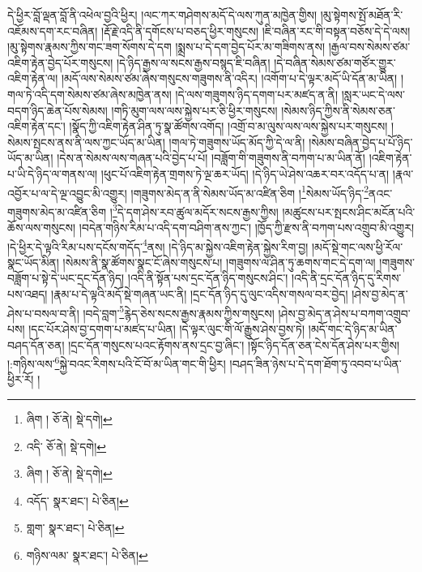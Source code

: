 དེ་ཕྱིར་བློ་ལྡན་བློ་ནི་འཕེལ་བྱའི་ཕྱིར། །ལང་ཀར་གཤེགས་མདོ་དེ་ལས་ཀུན་མཁྱེན་གྱིས། །མུ་སྟེགས་སྤོ་མཐོན་རི་འཇོམས་དག་རང་བཞིན། །རྡོ་རྗེ་འདི་ནི་དགོངས་པ་བཅད་ཕྱིར་གསུངས། །ཇི་བཞིན་རང་གི་བསྟན་བཅོས་དེ་དེ་ལས། །མུ་སྟེགས་རྣམས་ཀྱིས་གང་ཟག་སོགས་དེ་དག །སྨྲས་པ་དེ་དག་བྱེད་པོར་མ་གཟིགས་ནས། །རྒྱལ་བས་སེམས་ཙམ་འཇིག་རྟེན་བྱེད་པོར་གསུངས། །དེ་ཉིད་རྒྱས་ལ་སངས་རྒྱས་བསྙད་ཇི་བཞིན། །དེ་བཞིན་སེམས་ཙམ་གཙོར་གྱུར་འཇིག་རྟེན་ལ། །མདོ་ལས་སེམས་ཙམ་ཞེས་གསུངས་གཟུགས་ནི་འདིར། །འགོག་པ་དེ་ལྟར་མདོ་ཡི་དོན་མ་ཡིན། །གལ་ཏེ་འདི་དག་སེམས་ཙམ་ཞེས་མཁྱེན་ནས། །དེ་ལས་གཟུགས་ཉིད་དགག་པར་མཛད་ན་ནི། །སླར་ཡང་དེ་ལས་བདག་ཉིད་ཆེན་པོས་སེམས། །གཏི་མུག་ལས་ལས་སྐྱེས་པར་ཅི་ཕྱིར་གསུངས། །སེམས་ཉིད་ཀྱིས་ནི་སེམས་ཅན་འཇིག་རྟེན་དང་། །སྣོད་ཀྱི་འཇིག་རྟེན་ཤིན་ཏུ་སྣ་ཚོགས་འགོད། །འགྲོ་བ་མ་ལུས་ལས་ལས་སྐྱེས་པར་གསུངས། །སེམས་སྤངས་ནས་ནི་ལས་ཀྱང་ཡོད་མ་ཡིན། །གལ་ཏེ་གཟུགས་ཡོད་མོད་ཀྱི་དེ་ལ་ནི། །སེམས་བཞིན་བྱེད་པ་པོ་ཉིད་ཡོད་མ་ཡིན། །དེས་ན་སེམས་ལས་གཞན་པའི་བྱེད་པ་པོ། །བཟློག་གི་གཟུགས་ནི་བཀག་པ་མ་ཡིན་ནོ། །འཇིག་རྟེན་པ་ཡི་དེ་ཉིད་ལ་གནས་ལ། །ཕུང་པོ་འཇིག་རྟེན་གྲགས་ཏེ་ལྔ་ཆར་ཡོད། །དེ་ཉིད་ཡེ་ཤེས་འཆར་བར་འདོད་པ་ན། །རྣལ་འབྱོར་པ་ལ་དེ་ལྔ་འབྱུང་མི་འགྱུར། །གཟུགས་མེད་ན་ནི་སེམས་ཡོད་མ་འཛིན་ཅིག །\footnote{ཞིག །  ཅོ་ནེ།  སྡེ་དགེ། }སེམས་ཡོད་ཉིད་\footnote{འདི་  ཅོ་ནེ།  སྡེ་དགེ། }ནའང་གཟུགས་མེད་མ་འཛིན་ཅིག །\footnote{ཞིག །  ཅོ་ནེ།  སྡེ་དགེ། }དེ་དག་ཤེས་རབ་ཚུལ་མདོར་སངས་རྒྱས་ཀྱིས། །མཚུངས་པར་སྤངས་ཤིང་མངོན་པའི་ཆོས་ལས་གསུངས། །བདེན་གཉིས་རིམ་པ་འདི་དག་བཤིག་ནས་ཀྱང་། །ཁྱོད་ཀྱི་རྫས་ནི་བཀག་པས་འགྲུབ་མི་འགྱུར། །དེ་ཕྱིར་དེ་ལྟའི་རིམ་པས་དངོས་གདོད་\footnote{འདོད་  སྣར་ཐང་།  པེ་ཅིན། }ནས། །དེ་ཉིད་མ་སྐྱེས་འཇིག་རྟེན་སྐྱེས་རིག་བྱ། །མདོ་སྡེ་གང་ལས་ཕྱི་རོལ་སྣང་ཡོད་མིན། །སེམས་ནི་སྣ་ཚོགས་སྣང་ངོ་ཞེས་གསུངས་པ། །གཟུགས་ལ་ཤིན་ཏུ་ཆགས་གང་དེ་དག་ལ། །གཟུགས་བཟློག་པ་སྟེ་དེ་ཡང་དྲང་དོན་ཉིད། །འདི་ནི་སྟོན་པས་དྲང་དོན་ཉིད་གསུངས་ཤིང་། །འདི་ནི་དྲང་དོན་ཉིད་དུ་རིགས་པས་འཐད། །རྣམ་པ་དེ་ལྟའི་མདོ་སྡེ་གཞན་ཡང་ནི། །དྲང་དོན་ཉིད་དུ་ལུང་འདིས་གསལ་བར་བྱེད། །ཤེས་བྱ་མེད་ན་ཤེས་པ་བསལ་བ་ནི། །བདེ་བླག་\footnote{གླག་  སྣར་ཐང་།  པེ་ཅིན། }རྙེད་ཅེས་སངས་རྒྱས་རྣམས་ཀྱིས་གསུངས། །ཤེས་བྱ་མེད་ན་ཤེས་པ་བཀག་འགྲུབ་པས། །དང་པོར་ཤེས་བྱ་དགག་པ་མཛད་པ་ཡིན། །དེ་ལྟར་ལུང་གི་ལོ་རྒྱུས་ཤེས་བྱས་ཏེ། །མདོ་གང་དེ་ཉིད་མ་ཡིན་བཤད་དོན་ཅན། །དྲང་དོན་གསུངས་པའང་རྟོགས་ནས་དྲང་བྱ་ཞིང་། །སྟོང་ཉིད་དོན་ཅན་ངེས་དོན་ཤེས་པར་གྱིས། །:གཉིས་ལས་\footnote{གཉིས་ལམ་  སྣར་ཐང་།  པེ་ཅིན། }སྐྱེ་བའང་རིགས་པའི་ངོ་བོ་མ་ཡིན་གང་གི་ཕྱིར། །བཤད་ཟིན་ཉེས་པ་དེ་དག་ཐོག་ཏུ་འབབ་པ་ཡིན་ཕྱིར་རོ། །
